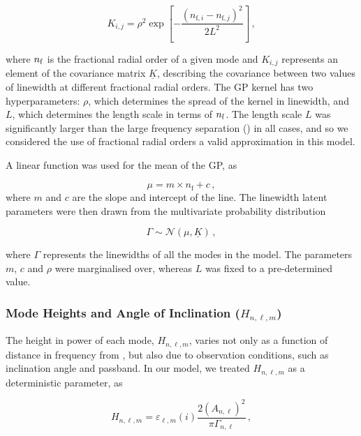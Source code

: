 \begin{equation}\label{eq:gpkernel}
	K_{i,j} = \rho^2 \exp \left[ -\frac{(n_{\textrm{f}, i} - n_{\textrm{f}, j})^2}{2L^2} \right]\, ,
\end{equation}

\noindent where $n_{\rm f}$ is the fractional radial order of a given mode and  $K_{i,j}$ represents an element of the covariance matrix $\underline{K}$, describing the covariance between two values of linewidth at different fractional radial orders. The GP kernel has two hyperparameters: $\rho$, which determines the spread of the kernel in linewidth, and $L$, which determines the length scale in terms of $n_{\rm f}$. The length scale $L$ was significantly larger than the large frequency separation (\dnu) in all cases, and so we considered the use of fractional radial orders a valid approximation in this model.

A linear function was used for the mean of the GP, as

\begin{equation}\label{eq:gpmean}
	\mu = m \times n_{\textrm{f}} + c\, ,
\end{equation}
where $m$ and $c$ are the slope and intercept of the line. The linewidth latent parameters were then drawn from the multivariate probability distribution

\begin{equation}\label{eq:gammagp}
	\Gamma \sim \mathcal{N}(\mu, \underline{K})\, ,
\end{equation}

\noindent where $\Gamma$ represents the linewidths of all the modes in the model. The parameters $m$, $c$ and $\rho$ were marginalised over, whereas $L$ was fixed to a pre-determined value.

\subsubsection{Mode Heights and Angle of Inclination ($H_{n,\ell,m}$)}
The height in power of each mode, $H_{n, \ell, m}$, varies not only as a function of distance in frequency from \numax, but also due to observation conditions, such as inclination angle and passband. In our model, we treated $H_{n, \ell, m}$ as a deterministic parameter, as

\begin{equation}\label{eq:height}
	H_{n, \ell, m} =  \varepsilon_{\ell, m}(i) \frac{2 (A_{n, \ell})^2}{\pi \Gamma_{n, \ell}}\, ,
\end{equation}

